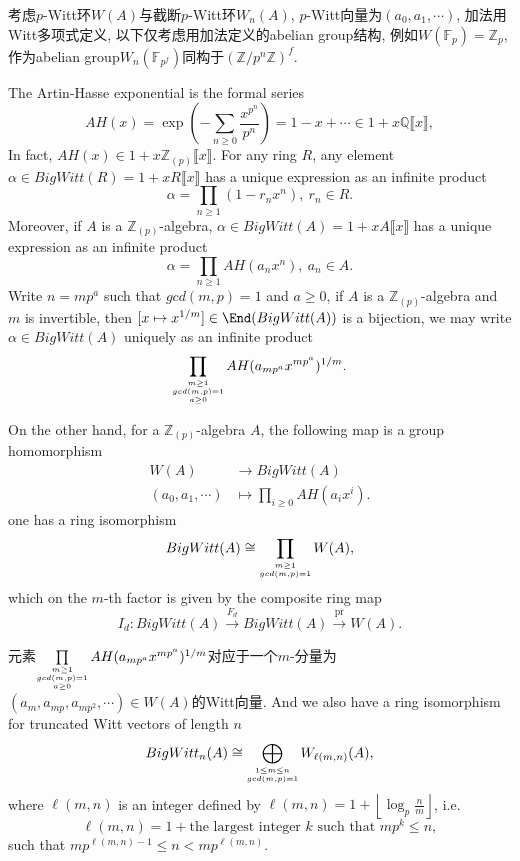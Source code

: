 考虑$p$-Witt环$W(A)$与截断$p$-Witt环$W_n(A)$, $p$-Witt向量为$(a_0,a_1,\cdots)$, 加法用Witt多项式定义, 以下仅考虑用加法定义的abelian group结构, 例如$W(\mathbb{F}_p)=\mathbb{Z}_{p}$, 作为abelian group$W_n(\mathbb{F}_{p^f})$同构于$(\mathbb{Z}/p^n\mathbb{Z})^f$. %

The Artin-Hasse exponential is the formal series
\[AH(x)= \exp(-\sum_{n\geq 0}\frac{x^{p^n}}{p^n})=1-x+\cdots \in 1+x \mathbb{Q}\llbracket x\rrbracket,\]
In fact, $AH(x)\in 1+x \mathbb{Z}_{(p)}\llbracket x\rrbracket $. For any ring $R$, any element $\alpha\in BigWitt(R)=1+xR\llbracket x\rrbracket $ has a unique expression as an infinite product
\[\alpha = \prod_{n\geq 1}(1-r_nx^n),\ r_n\in R.\]
Moreover, if $A$ is a $\mathbb{Z}_{(p)}$-algebra, $\alpha \in BigWitt(A)=1+xA\llbracket x\rrbracket $ has a unique expression as an infinite product
\[\alpha = \prod_{n\geq 1}AH(a_n x^n),\ a_n\in A.\]
Write $n=mp^a$ such that $gcd(m,p)=1$ and $a\geq 0$, if $A$ is a $\mathbb{Z}_{(p)}$-algebra and $m$ is invertible, then $[x\mapsto x^{1/m}]\in \End(BigWitt(A))$ is a bijection, we may write $\alpha\in BigWitt(A)$ uniquely as an infinite product
\[\prod_{\scriptsize\substack{m\geq 1 \\ gcd(m,p)=1  \\ a\geq 0}}AH(a_{mp^a} x^{mp^a})^{1/m}.\]

On the other hand, for a $\mathbb{Z}_{(p)}$-algebra $A$, 
the following map is a group homomorphism
\begin{align*}
W(A)&\longrightarrow BigWitt(A)\\
(a_0,a_1,\cdots) &\mapsto \prod_{i\geq 0}AH(a_i x^i).
\end{align*}
one has a ring isomorphism
\[
BigWitt(A) \cong \prod_{\scriptsize\substack{m\geq 1 \\ gcd(m,p)=1}} W(A),
\]
which on the $m$-th factor is given by the composite ring map
\[I_d: BigWitt(A) \overset{F_d}\longrightarrow   BigWitt(A) \overset{\mathrm{pr}}\longrightarrow W(A).\]

元素$\prod\limits_{\scriptsize\substack{m\geq 1 \\ gcd(m,p)=1  \\ a\geq 0}}AH(a_{mp^a} x^{mp^a})^{1/m}$对应于一个$m$-分量为$(a_m,a_{mp},a_{mp^2},\cdots)\in W(A)$的Witt向量. 
And we also have a ring isomorphism for truncated Witt vectors of length $n$
\[
BigWitt_n(A) \cong \bigoplus_{\scriptsize\substack{1\leq m\leq n \\ gcd(m,p)=1}} W_{\ell(m,n)}(A),
\]
where $\ell(m,n)$ is an integer defined by $\ell(m,n)=1+\left \lfloor\log_p \frac{n}{m}  \right \rfloor$, i.e. 
\[\ell(m,n)=1+\text{the largest integer $k$ such that $mp^k\leq n$},\]
such that $mp^{\ell(m,n)-1}\leq n< mp^{\ell(m,n)}$.

